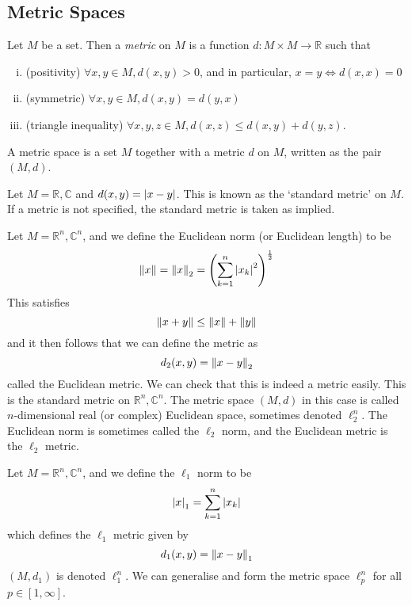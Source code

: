 \subsection{Metric Spaces}
\begin{definition}
	Let \( M \) be a set.
	Then a \textit{metric} on \( M \) is a function \( d \colon M \times M \to \mathbb R \) such that
	\begin{enumerate}[(i)]
		\item (positivity) \( \forall x,y \in M, d(x,y) > 0 \), and in particular, \( x = y \iff d(x,x) = 0 \)
		\item (symmetric) \( \forall x,y \in M, d(x,y) = d(y,x) \)
		\item (triangle inequality) \( \forall x,y,z \in M, d(x,z) \leq d(x,y) + d(y,z) \).
	\end{enumerate}
	A metric space is a set \( M \) together with a metric \( d \) on \( M \), written as the pair \( (M, d) \).
\end{definition}
\begin{example}
	Let \( M = \mathbb R, \mathbb C \) and \( d(x,y) = \abs{x-y} \).
	This is known as the `standard metric' on \( M \).
	If a metric is not specified, the standard metric is taken as implied.
\end{example}
\begin{example}
	Let \( M = \mathbb R^n, \mathbb C^n \), and we define the Euclidean norm (or Euclidean length) to be
	\[
		\norm{x} = \norm{x}_2 = \qty(\sum_{k=1}^n \abs{x_k}^2)^{\frac{1}{2}}
	\]
	This satisfies
	\[
		\norm{x+y} \leq \norm{x} + \norm{y}
	\]
	and it then follows that we can define the metric as
	\[
		d_2(x,y) = \norm{x-y}_2
	\]
	called the Euclidean metric.
	We can check that this is indeed a metric easily.
	This is the standard metric on \( \mathbb R^n, \mathbb C^n \).
	The metric space \( (M, d) \) in this case is called \( n \)-dimensional real (or complex) Euclidean space, sometimes denoted \( \ell_2^n \).
	The Euclidean norm is sometimes called the \( \ell_2 \) norm, and the Euclidean metric is the \( \ell_2 \) metric.
\end{example}
\begin{example}
	Let \( M = \mathbb R^n, \mathbb C^n \), and we define the \( \ell_1 \) norm to be
	\[
		\abs{x}_1 = \sum_{k=1}^n \abs{x_k}
	\]
	which defines the \( \ell_1 \) metric given by
	\[
		d_1(x,y) = \norm{x-y}_1
	\]
	\( (M, d_1) \) is denoted \( \ell_1^n \).
	We can generalise and form the metric space \( \ell_p^n \) for all \( p \in [1, \infty] \).
\end{example}
